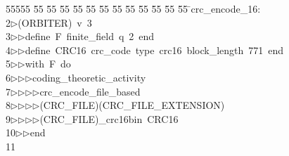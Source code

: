 %
%
\begin{tabbing}
55555 \= 55 \= 55 \= 55 \= 55 \= 55 \= 55 \= 55 \= 55 \= 55 \= 55 \= 55 \= 55 \= \>crc\_encode\_16:\\[0pt]
2\>$\triangleright$\>(ORBITER)\ v\ 3\ \\[0pt]
3\>$\triangleright$\>$\triangleright$\>define\ F\ finite\_field\ q\ 2\ end\ \\[0pt]
4\>$\triangleright$\>$\triangleright$\>define\ CRC16\ crc\_code\ type\ crc16\ block\_length\ 771\ end\ \\[0pt]
5\>$\triangleright$\>$\triangleright$\>with\ F\ do\ \\[0pt]
6\>$\triangleright$\>$\triangleright$\>$\triangleright$\>coding\_theoretic\_activity\ \\[0pt]
7\>$\triangleright$\>$\triangleright$\>$\triangleright$\>$\triangleright$\>crc\_encode\_file\_based\ \\[0pt]
8\>$\triangleright$\>$\triangleright$\>$\triangleright$\>$\triangleright$\>(CRC\_FILE)(CRC\_FILE\_EXTENSION)\ \\[0pt]
9\>$\triangleright$\>$\triangleright$\>$\triangleright$\>$\triangleright$\>(CRC\_FILE)\_crc16bin\ CRC16\ \\[0pt]
10\>$\triangleright$\>$\triangleright$\>end\\[0pt]
11\>\end{tabbing}

